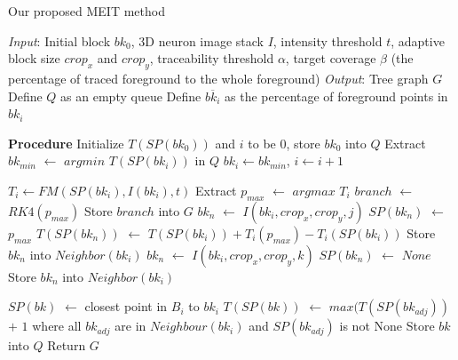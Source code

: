 \documentclass[conference]{IEEEtran}
\begin{document}
\begin{algorithm}
\caption{Our proposed MEIT method}
\label{fmalgorithm}
\begin{algorithmic}[1]
\State \textit{Input}: Initial block $bk_0$, 3D neuron image stack $I$, intensity threshold $t$, adaptive block size $crop_x$ and $crop_y$, traceability threshold $\alpha$, target coverage $\beta$ (the percentage of traced foreground to the whole foreground)
\State \textit{Output}: Tree graph $G$
\State Define $Q$ as an empty queue
\State Define $\overline{bk_i}$ as the percentage of foreground points in ${bk_i}$

\State \textbf{Procedure}
\State Initialize $T(SP(bk_0))$ and $i$ to be 0, store $bk_0$ into $Q$ 
\State Extract $bk_{min}$ $\gets$ $argmin$ $T(SP(bk_i))$ in $Q$
\State $bk_i \gets bk_{min}$, $i \gets i + 1$

    \State $T_i \gets FM(SP(bk_i), I(bk_i), t)$
    \State Extract $p_{max}$ $\gets$ $argmax$ $T_i$
        \State $branch$ $\gets$ $RK4(p_{max})$
            \State Store $branch$ into $G$
                \State $bk_n$ $\gets$ $I(bk_i, crop_x, crop_y, j)$
                \State $SP(bk_n)$ $\gets$ $p_{max}$
                \State $T(SP(bk_n))$ $\gets$ $T(SP(bk_i))+T_i(p_{max})-T_i(SP(bk_i))$
                \State Store $bk_n$ into $Neighbor(bk_i)$
            \EndIf
        \EndIf
    \EndWhile
        \State $bk_n$ $\gets$ $I(bk_i, crop_x, crop_y, k)$
        \State $SP(bk_n)$ $\gets$ $None$
        \State Store $bk_n$ into $Neighbor(bk_i)$
        \EndIf
    \EndFor

            \State $SP(bk)$ $\gets$ closest point in $B_i$ to $bk_i$
            \State $T(SP(bk))$ $\gets$ $max(T(SP(bk_{adj}))$  $+$ $1$ where all $bk_{adj}$ are in $Neighbour(bk_{i})$ and $SP(bk_{adj})$ is not None 
        \EndIf
        \State Store $bk$ into $Q$
    \EndFor
\EndIf
\EndWhile
\State Return $G$
\end{algorithmic}

\end{algorithm}
\end{document}
